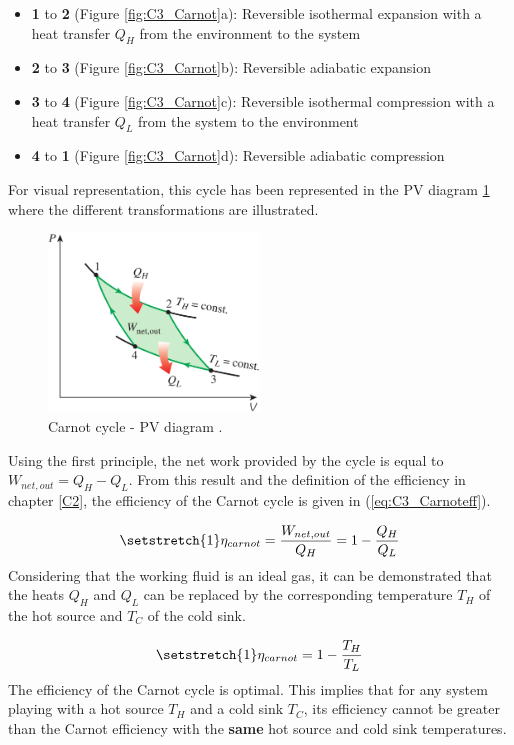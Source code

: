 \begin{itemize}
\item \textbf{1} to \textbf{2} (Figure \ref{fig:C3_Carnot}a): Reversible isothermal expansion with a heat transfer $Q_H$ from the environment to the system
\item \textbf{2} to \textbf{3} (Figure \ref{fig:C3_Carnot}b): Reversible  adiabatic expansion
\item \textbf{3} to \textbf{4} (Figure \ref{fig:C3_Carnot}c): Reversible isothermal compression with a heat transfer $Q_L$ from the system to the environment
\item \textbf{4} to \textbf{1} (Figure \ref{fig:C3_Carnot}d): Reversible adiabatic compression
\end{itemize}
For visual representation, this cycle has been represented in the PV diagram \ref{fig:C3_CarnotPV} where the different transformations are illustrated.
\begin{figure}[h]
\centering
\includegraphics[width=0.5\textwidth]{Carnot_PV.png}
\caption{Carnot cycle - PV diagram \cite{2015}.}
\label{fig:C3_CarnotPV}
\end{figure}
Using the first principle, the net work provided by the cycle is equal to $W_{net,out}=Q_H-Q_L$. From this result and the definition of the efficiency in chapter \ref{C2}, the efficiency of the Carnot cycle is given in (\ref{eq:C3_Carnoteff}).

\begin{equation}
\setstretch{1}
\eta_{carnot} = \frac{W_{net,out}}{Q_H} = 1 - \frac{Q_H}{Q_L}\label{eq:C3_Carnoteff}
\end{equation} 
Considering that the working fluid is an ideal gas, it can be demonstrated that the heats $Q_H$ and $Q_L$ can be replaced by the corresponding temperature $T_H$ of the hot source and $T_C$ of the cold sink.

\begin{equation}
\setstretch{1}
\eta_{carnot}=1-\frac{T_H}{T_L}\label{eq:C3_eff_carnot}
\end{equation} 
The efficiency of the Carnot cycle is optimal. This implies that for any system playing with a hot source $T_H$ and a cold sink $T_C$, its efficiency cannot be greater than the Carnot efficiency with the \textbf{same} hot source and cold sink temperatures.
